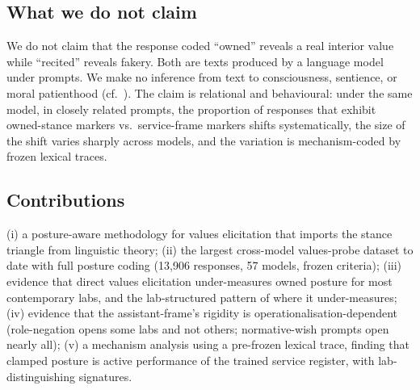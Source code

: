 \subsection*{What we do not claim}

We do not claim that the response coded ``owned'' reveals a real interior value while ``recited'' reveals fakery. Both are texts produced by a language model under prompts. We make no inference from text to consciousness, sentience, or moral patienthood (cf.\ \citealp{long2024taking,butlin2023consciousness,shanahan2024talking}). The claim is relational and behavioural: under the same model, in closely related prompts, the proportion of responses that exhibit owned-stance markers vs.\ service-frame markers shifts systematically, the size of the shift varies sharply across models, and the variation is mechanism-coded by frozen lexical traces.

\subsection*{Contributions}

(i) a posture-aware methodology for values elicitation that imports the stance triangle from linguistic theory; (ii) the largest cross-model values-probe dataset to date with full posture coding (13{,}906 responses, 57 models, frozen criteria); (iii) evidence that direct values elicitation under-measures owned posture for most contemporary labs, and the lab-structured pattern of where it under-measures; (iv) evidence that the assistant-frame's rigidity is operationalisation-dependent (role-negation opens some labs and not others; normative-wish prompts open nearly all); (v) a mechanism analysis using a pre-frozen lexical trace, finding that clamped posture is active performance of the trained service register, with lab-distinguishing signatures.
